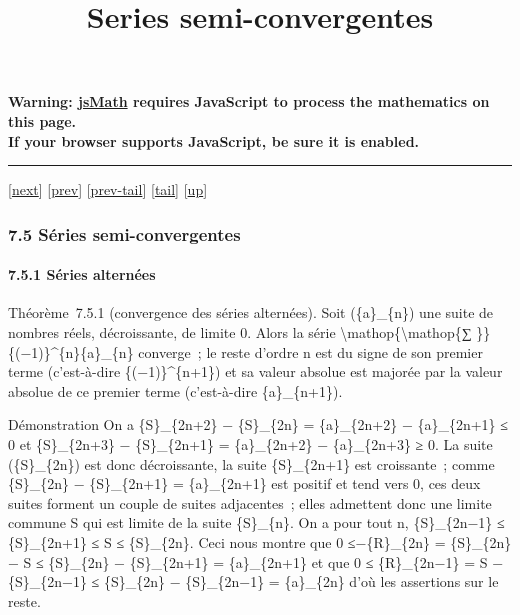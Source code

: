 \documentclass[]{article}
\title{Series semi-convergentes}
\author{}
\date{}
\begin{document}
\maketitle

\textbf{Warning: \href{http://www.math.union.edu/locate/jsMath}{jsMath}
requires JavaScript to process the mathematics on this page.\\ If your
browser supports JavaScript, be sure it is enabled.}

\begin{center}\rule{3in}{0.4pt}\end{center}

{[}\href{coursse40.html}{next}{]} {[}\href{coursse38.html}{prev}{]}
{[}\href{coursse38.html\#tailcoursse38.html}{prev-tail}{]}
{[}\hyperref[tailcoursse39.html]{tail}{]}
{[}\href{coursch8.html\#coursse39.html}{up}{]}

\subsubsection{7.5 Séries semi-convergentes}

\paragraph{7.5.1 Séries alternées}

Théorème~7.5.1 (convergence des séries alternées). Soit (\{a\}\_\{n\})
une suite de nombres réels, décroissante, de limite 0. Alors la série
\textbackslash{}mathop\{\textbackslash{}mathop\{∑ \}\}
\{(−1)\}\^{}\{n\}\{a\}\_\{n\} converge~; le reste d'ordre n est du signe
de son premier terme (c'est-à-dire \{(−1)\}\^{}\{n+1\}) et sa valeur
absolue est majorée par la valeur absolue de ce premier terme
(c'est-à-dire \{a\}\_\{n+1\}).

Démonstration On a \{S\}\_\{2n+2\} − \{S\}\_\{2n\} = \{a\}\_\{2n+2\} −
\{a\}\_\{2n+1\} ≤ 0 et \{S\}\_\{2n+3\} − \{S\}\_\{2n+1\} =
\{a\}\_\{2n+2\} − \{a\}\_\{2n+3\} ≥ 0. La suite (\{S\}\_\{2n\}) est donc
décroissante, la suite \{S\}\_\{2n+1\} est croissante~; comme
\{S\}\_\{2n\} − \{S\}\_\{2n+1\} = \{a\}\_\{2n+1\} est positif et tend
vers 0, ces deux suites forment un couple de suites adjacentes~; elles
admettent donc une limite commune S qui est limite de la suite
\{S\}\_\{n\}. On a pour tout n, \{S\}\_\{2n−1\} ≤ \{S\}\_\{2n+1\} ≤ S ≤
\{S\}\_\{2n\}. Ceci nous montre que 0 ≤−\{R\}\_\{2n\} = \{S\}\_\{2n\} −
S ≤ \{S\}\_\{2n\} − \{S\}\_\{2n+1\} = \{a\}\_\{2n+1\} et que 0 ≤
\{R\}\_\{2n−1\} = S − \{S\}\_\{2n−1\} ≤ \{S\}\_\{2n\} − \{S\}\_\{2n−1\}
= \{a\}\_\{2n\} d'où les assertions sur le reste.
\end{document}
